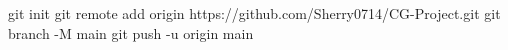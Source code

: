 git init
git remote add origin https://github.com/Sherry0714/CG-Project.git
git branch -M main
git push -u origin main
